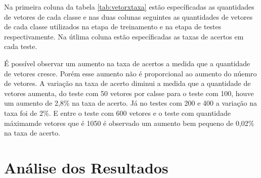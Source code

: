 Na primeira coluna da tabela \ref{tab:vetorxtaxa} estão específicadas as quantidades de vetores de cada classe e nas duas colunas seguintes as quantidades de vetores de cada classe utilizados na etapa de treinamento e na etapa de testes respectivamente. Na útlima coluna estão específicadas as taxas de acertos em cada teste. 

É possível observar um aumento na taxa de acertos a medida que a quantidade de vetores cresce. Porém esse aumento não é proporcional ao aumento do núemro de vetores. A variação na taxa de acerto diminui a medida que a quantidade de vetores aumenta, do teste com 50 vetores por calsse para o teste com 100, houve um aumento de 2,8\% na taxa de acerto. Já no testes com 200 e 400 a variação na taxa foi de 2\%. E entre o teste com 600 vetores e o teste com quantidade máximamde vetores que é 1050 é observado um aumento bem pequeno de 0,02\% na taxa de acerto.
\section{Análise dos Resultados}
